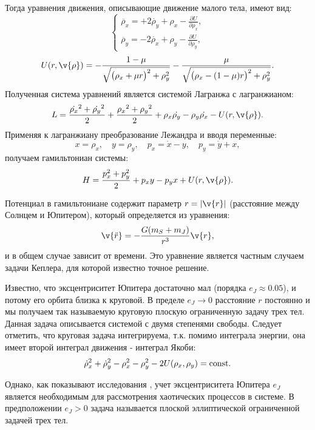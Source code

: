 Тогда уравнения движения, описывающие движение малого тела, имеют вид:
\begin{equation*}
 \begin{cases}
   \ddot{\rho_x}=+2 \dot{\rho_y} + \rho_x - \frac{\partial U}{\partial \rho_x}, \\
   \ddot{\rho_y}=-2 \dot{\rho_x} + \rho_y - \frac{\partial U}{\partial \rho_y},
 \end{cases}
\end{equation*}
$$U(r, \v{\rho}) = - \frac{1-\mu}{\sqrt{\big(\rho_x + \mu r \big)^2 + \rho_y^2}} - \frac{\mu}{\sqrt{\big(\rho_x - (1-  \mu ) r \big)^2 + \rho_y^2}}.$$
Полученная система уравнений является системой Лагранжа с лагранжианом:
$$L = \frac{\dot{\rho_x}^2 + \dot{\rho_y}^2}{2} + \frac{{\rho_x}^2 + {\rho_y}^2}{2} + \rho_x \dot{\rho_y} - \rho_y \dot{\rho_x} - U(r,\v{\rho}) .$$
Применяя к лагранжиану преобразование Лежандра и вводя переменные:
$$
x = \rho_x,\quad
y = \rho_y,\quad
p_x = \dot{x} - y,\quad
p_y = \dot{y} + x,
$$
получаем гамильтониан системы:
$$H = \frac{p_x^2 + p_y^2}{2} + p_xy - p_yx + U(r,\v{\rho}).$$

Потенциал в гамильтониане содержит параметр $r = |\v{r}|$ (расстояние между Солнцем и Юпитером), который определяется из уравнения:
$$\v{\ddot{r}} = -\frac{G(m_S+m_J)}{r^3} \v{r},$$
и в общем случае зависит от времени. Это уравнение является частным случаем задачи Кеплера, для которой известно точное решение. 

Известно, что эксцентриситет Юпитера достаточно мал (порядка $e_{J}\approx 0.05$), и потому его орбита близка к круговой. В пределе $e_{J}\to 0$ расстояние $r$ постоянно и мы получаем так называемую круговую плоскую ограниченную задачу трех тел. Данная задача описывается системой с двумя степенями свободы. Следует отметить, что круговая задача интегрируема, т.к. помимо интеграла энергии, она имеет второй интеграл движения - интеграл Якоби:
$$
\dot \rho_{x}^{2} + \dot \rho_{y}^{2} - \rho_{x}^{2} - \rho_{y}^{2} - 2 U(\rho_{x}, \rho_{y}) = {\rm const}.
$$

Однако, как показывают исследования \cite{fejoz, kaloshin}, учет эксцентриситета Юпитера $e_J$ является необходимым для рассмотрения хаотических процессов в системе. В предположении $e_{J}>0$ задача называется плоской эллиптической ограниченной задачей трех тел.



